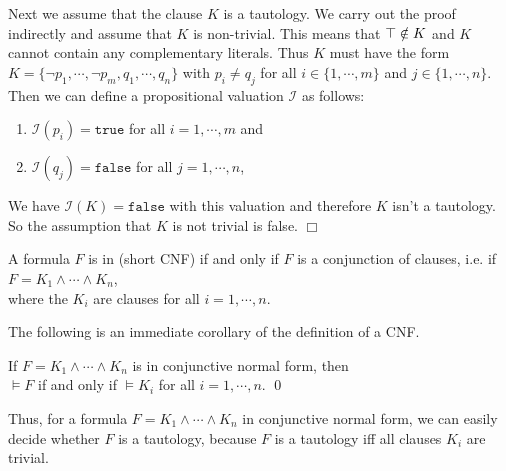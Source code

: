 Next we assume that the clause $K$ is a tautology.  We carry out the proof
indirectly and assume that $K$ is non-trivial.  This means that $\top \notin K$ and
$K$ cannot contain any complementary literals.  Thus $K$ must have the form
\\[0.2cm]
\hspace*{1.3cm} 
$K = \{ \neg p_1, \cdots, \neg p_m, q_1, \cdots, q_n \}$ \quad with $p_i
\not= q_j$ for all $i \in \{ 1,\cdots,m\}$ and $j \in \{1, \cdots, n\}$.
\\[0.2cm]
Then we can define a propositional valuation $\mathcal{I}$ as follows:
\begin{enumerate}
\item $\mathcal{I}(p_i) = \texttt{true}$ for all $i = 1, \cdots, m$ and
\item $\mathcal{I}(q_j) = \texttt{false}$ for all $j = 1, \cdots, n$,
\end{enumerate}
We have $\mathcal{I}(K) = \texttt{false}$ with this valuation and therefore $K$ isn't a tautology.  So the
assumption that $K$ is not trivial is false. 
\hspace*{\fill}  $\Box$

\begin{Definition}  
  A formula $F$ is in  (short CNF)
  if and only if $F$ is a conjunction of clauses, i.e. if \\[0.2cm]
  \hspace*{1.3cm} $F = K_1 \wedge \cdots \wedge K_n$, \\[0.2cm]
  where the $K_i$ are clauses for all $i=1,\cdots,n$. \eox
\end{Definition}

\noindent
The following is an immediate corollary of the definition of a CNF.
\begin{Corollary} \label{corollary:knf}
  If $F = K_1 \wedge \cdots \wedge K_n$ is in conjunctive normal form, then\\[0.2cm]
  \hspace*{1.3cm} $\models F$ \quad if and only if \quad $\models K_i$ \quad for all $i=1,\cdots,n$. \qed
\end{Corollary}

Thus, for a formula $F = K_1 \wedge \cdots \wedge K_n$ in conjunctive normal form, we can easily decide whether
$F$ is a tautology, because $F$ is a tautology iff all clauses $K_i$ are trivial.
\vspace*{0.2cm}

